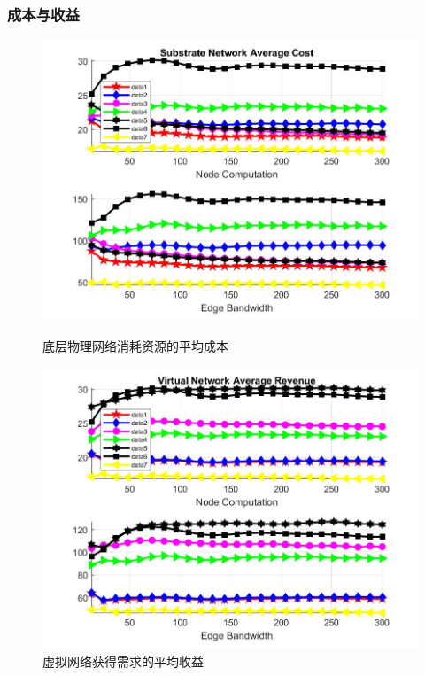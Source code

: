 \begin{frame}
\frametitle{成本与收益}
\begin{figure}[htbp]
\centering
\begin{minipage}{0.4\textwidth}
\centering
\includegraphics[width=\textwidth]{figures/CostAccumulateAverageSubstrateNetwork}
\caption{底层物理网络消耗资源的平均成本}\label{fig:CostAccumulateAverageSubstrateNetwork}
\end{minipage}
\begin{minipage}{0.4\textwidth}
\centering
\includegraphics[width=\textwidth]{figures/RevenueAccumulateAverageVirtualNetwork}
\caption{虚拟网络获得需求的平均收益}\label{fig:RevenueAccumulateAverageVirtualNetwork}
\end{minipage}\vspace{\baselineskip}
\end{figure}
\end{frame}
